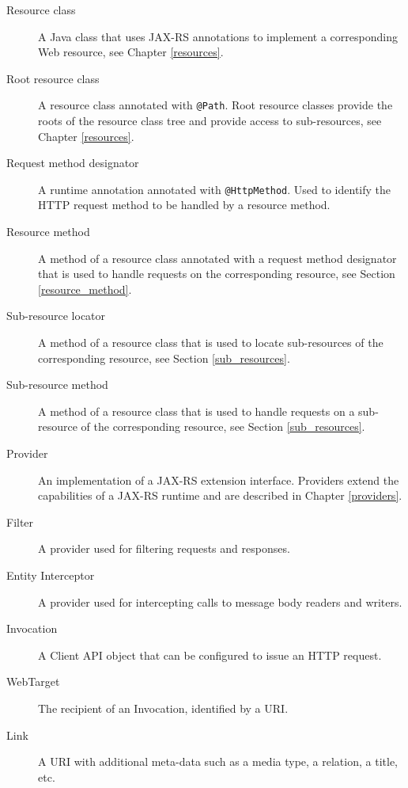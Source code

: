 \begin{description}
    \item[Resource class] A Java class that uses JAX-RS annotations to implement a corresponding Web resource, see
    Chapter \ref{resources}.
    \item[Root resource class] A resource class annotated with \lstinline{@Path}. Root resource classes provide the
    roots of the resource class tree and provide access to sub-resources, see Chapter \ref{resources}.
    \item[Request method designator] A runtime annotation annotated with \lstinline{@HttpMethod}. Used to identify the
    HTTP request method to be handled by a resource method.
    \item[Resource method] A method of a resource class annotated with a request method designator that is used to
    handle requests on the corresponding resource, see Section \ref{resource_method}.
    \item[Sub-resource locator] A method of a resource class that is used to locate sub-resources of the corresponding
    resource, see Section \ref{sub_resources}.
    \item[Sub-resource method] A method of a resource class that is used to handle requests on a sub-resource of the
    corresponding resource, see Section \ref{sub_resources}.
    \item[Provider] An implementation of a JAX-RS extension interface. Providers extend the capabilities of a JAX-RS
    runtime and are described in Chapter \ref{providers}.
    \item[Filter] A provider used for filtering requests and responses.
    \item[Entity Interceptor] A provider used for intercepting calls to message body readers and writers.
    \item[Invocation] A Client API object that can be configured to issue an HTTP request.
    \item[WebTarget] The recipient of an Invocation, identified by a URI.
    \item[Link] A URI with additional meta-data such as a media type, a relation, a title, etc.
\end{description}
